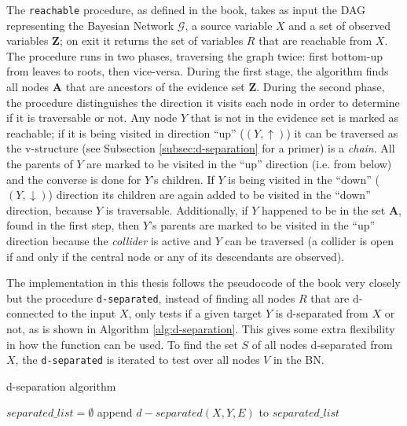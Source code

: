 The \texttt{reachable} procedure, as defined in the book, takes as input the DAG representing the Bayesian Network $\mathcal{G}$, a source variable $X$ and a set of observed variables $\boldsymbol{Z}$; on exit it returns the set of variables $R$ that are reachable from $X$.
The procedure runs in two phases, traversing the graph twice: first bottom-up from leaves to roots, then vice-versa.
During the first stage, the algorithm finds all nodes $\boldsymbol{A}$ that are ancestors of the evidence set $\boldsymbol{Z}$.
During the second phase, the procedure distinguishes the direction it visits each node in order to determine if it is traversable or not.
Any node $Y$ that is not in the evidence set is marked as reachable; if it is being visited in direction \enquote{up} ($(Y,\uparrow)$) it can be traversed as the v-structure (see Subsection \ref{subsec:d-separation} for a primer) is a \textit{chain}.
All the parents of $Y$ are marked to be visited in the \enquote{up} direction (i.e. from below) and the converse is done for $Y$'s children.
If $Y$ is being visited in the \enquote{down} ($(Y,\downarrow)$) direction its children are again added to be visited in the \enquote{down} direction, because $Y$ is traversable.
Additionally, if $Y$ happened to be in the set $\boldsymbol{A}$, found in the first step, then $Y$'s parents are marked to be visited in the \enquote{up} direction because the \textit{collider} is active and $Y$ can be traversed (a collider is open if and only if the central node or any of its descendants are observed).

The implementation in this thesis follows the pseudocode of the book very closely but the procedure \texttt{d-separated}, instead of finding all nodes $R$ that are d-connected to the input $X$, only tests if a given target $Y$ is d-separated from $X$ or not, as is shown in Algorithm \ref{alg:d-separation}.
This gives some extra flexibility in how the function can be used.
To find the set $S$ of all nodes d-separated from $X$, the \texttt{d-separated} is iterated to test over all nodes $V$ in the BN.

\begin{algorithm}[htp!]
	\caption{d-separation algorithm}
	\label{alg:d-separation}
	\begin{algorithmic}[1]
		\State $separated\_list = \emptyset$
			\State append $d-separated(X, Y, E)$ to $separated\_list$ 
		\EndFor
	\end{algorithmic}
\end{algorithm}

